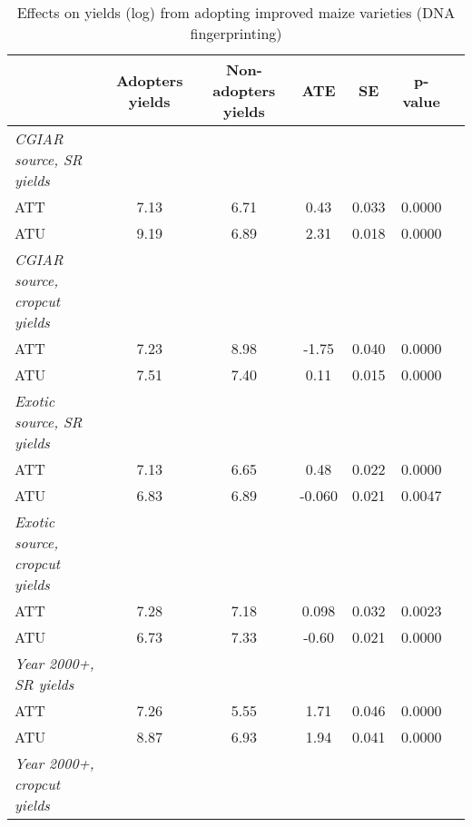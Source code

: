 \begin{table}[H]
\centering
\hspace*{-1.2cm}
\begin{threeparttable}
\caption{Effects on yields (log) from adopting improved maize varieties (DNA fingerprinting)}
\label{tab:switch3}
\begin{tabular}{l cccccc}
\hline
\hline
            &Adopters yields&Non-adopters yields&         ATE&          SE&     p-value\\
\hline
\textit{CGIAR source, SR yields}&            &            &            &            &            \\
ATT         &        7.13&        6.71&        0.43&       0.033&      0.0000\\
%
%
%
ATU         &        9.19&        6.89&        2.31&       0.018&      0.0000\\
%
%
%
\textit{CGIAR source, cropcut yields}&            &            &            &            &            \\
ATT         &        7.23&        8.98&       -1.75&       0.040&      0.0000\\
%
%
%
ATU         &        7.51&        7.40&        0.11&       0.015&      0.0000\\
%
%
%
\textit{Exotic source, SR yields}&            &            &            &            &            \\
ATT         &        7.13&        6.65&        0.48&       0.022&      0.0000\\
%
%
%
ATU         &        6.83&        6.89&      -0.060&       0.021&      0.0047\\
%
%
%
\textit{Exotic source, cropcut yields}&            &            &            &            &            \\
ATT         &        7.28&        7.18&       0.098&       0.032&      0.0023\\
%
%
%
ATU         &        6.73&        7.33&       -0.60&       0.021&      0.0000\\
%
%
%
\textit{Year 2000+, SR yields}&            &            &            &            &            \\
ATT         &        7.26&        5.55&        1.71&       0.046&      0.0000\\
%
%
%
ATU         &        8.87&        6.93&        1.94&       0.041&      0.0000\\
%
%
%
\textit{Year 2000+, cropcut yields}&            &            &            &            &            \\

\end{tabular}
\end{threeparttable}
\end{table}
